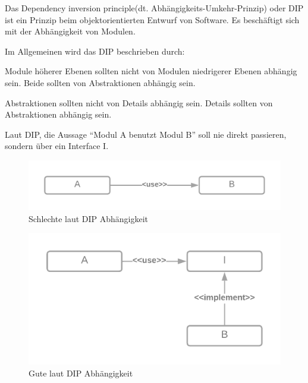 Das Dependency inversion principle(dt. Abhängigkeits-Umkehr-Prinzip) oder DIP ist ein Prinzip 
beim objektorientierten Entwurf von Software. Es beschäftigt sich mit der Abhängigkeit von Modulen.

Im Allgemeinen wird das DIP beschrieben durch:

Module höherer Ebenen sollten nicht von Modulen niedrigerer Ebenen abhängig sein.
Beide sollten von Abstraktionen abhängig sein.


Abstraktionen sollten nicht von Details abhängig sein.
Details sollten von Abstraktionen abhängig sein.

Laut DIP, die Aussage ``Modul A benutzt Modul B'' soll nie direkt passieren, sondern über ein Interface I.

\begin{figure}[H]
    \centering
    \includegraphics[width=1\textwidth]{./images/DIP - bad.png}
    \caption[Schlechte laut DIP Abhängigkeit]{Schlechte laut DIP Abhängigkeit}
    \label{fig:MVP}
\end{figure}


\begin{figure}[H]
    \centering
    \includegraphics[width=1\textwidth]{./images/DIP - good.png}
    \caption[Gute laut DIP Abhängigkeit]{Gute laut DIP Abhängigkeit}
    \label{fig:MVP}
\end{figure}

